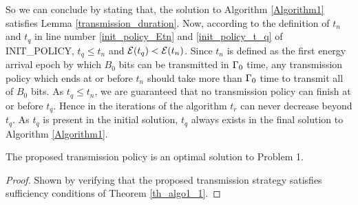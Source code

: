 So we can conclude by stating that, the solution to Algorithm \ref{Algorithm1} satisfies Lemma \ref{transmission_duration}. Now, according to the definition of $t_n$ and $t_q$ in line number \ref{init_policy_Etn} and \ref{init_policy_t_q} of INIT\_POLICY, $t_q\le t_n$ and $\mathcal{E}(t_q)<\mathcal{E}(t_n)$. Since $t_n$ is defined as the first energy arrival epoch by which $B_0$ bits can be transmitted in $\Gamma_0$ time, any transmission policy which ends at or before $t_n$ should take more than $\Gamma_0$ time to transmit all of $B_0$ bits. As $t_q\le t_n$, we are guaranteed that no transmission policy can finish at or before $t_q$. Hence in the iterations of the algorithm $t_r$ can never decrease beyond $t_q$. As $t_q$ is present in the initial solution, $t_q$ always exists in the final solution to Algorithm \ref{Algorithm1}.   


\begin{theorem}
The proposed transmission policy is an optimal solution to Problem 1.
\label{th_algo1_2}
\end{theorem}
\begin{proof}
Shown by verifying that the proposed transmission strategy satisfies sufficiency conditions of Theorem \ref{th_algo1_1}.
\end{proof}